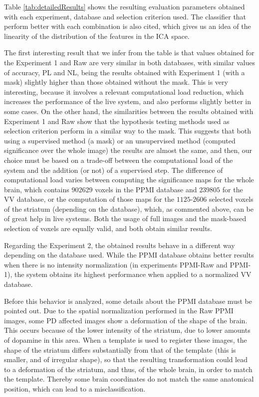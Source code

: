 	Table \ref{tab:detailedResults} shows the resulting evaluation parameters obtained with each experiment, database and selection criterion used. The classifier that perform better with each combination is also cited, which gives us an idea of the linearity of the distribution of the features in the ICA space. 
	
	The first interesting result that we infer from the table is that values obtained for the Experiment 1 and Raw are very similar in both databases, with similar values of accuracy, PL and NL, being the results obtained with Experiment 1 (with a mask) slightly higher than those obtained without the mask. This is very interesting, because it involves a relevant computational load reduction, which increases the performance of the live system, and also performs slightly better in some cases. On the other hand, the similarities between the results obtained with Experiment 1 and Raw show that the hypothesis testing methods used as selection criterion perform in a similar way to the mask. This suggests that both using a supervised method (a mask) or an unsupervised method (computed significance over the whole image) the results are almost the same, and then, our choice must be based on a trade-off between the computational load of the system and the addition (or not) of a supervised step. The difference of computational load varies between computing the significance maps for the whole brain, which contains $902629$ voxels in the PPMI database and $239805$ for the VV database, or the computation of those maps for the $1125$-$2606$ selected voxels of the striatum (depending on the database), which, as commented above, can be of great help in live systems. Both the usage of full images and the mask-based selection of voxels are equally valid, and both obtain similar results. 
	
	Regarding the Experiment 2, the obtained results behave in a different way depending on the database used. While the PPMI database obtains better results when there is no intensity normalization (in experiments PPMI-Raw and PPMI-1), the system obtains its highest performance when applied to a normalized VV database. 
	
	Before this behavior is analyzed, some details about the PPMI database must be pointed out. Due to the spatial normalization performed in the Raw PPMI images, some PD affected images show a deformation of the shape of the brain. This occurs because of the lower intensity of the striatum, due to lower amounts of dopamine in this area. When a template is used to register these images, the shape of the striatum differs substantially from that of the template (this is smaller, and of irregular shape), so that the resulting transformation could lead to a deformation of the striatum, and thus, of the whole brain, in order to match the template. Thereby some brain coordinates do not match the same anatomical position, which can lead to a misclassification.
	
